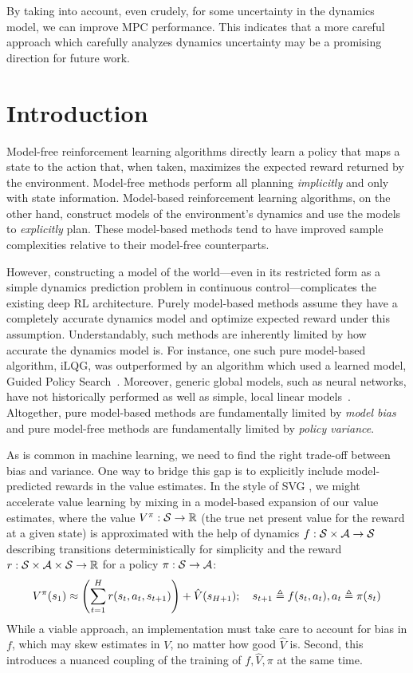 \documentclass{article}
\begin{document}
By taking into account, even crudely, for some uncertainty in the dynamics model, we can improve MPC performance. This indicates that a more careful approach which carefully analyzes dynamics uncertainty may be a promising direction for future work.

\section{Introduction}
Model-free reinforcement learning algorithms directly learn a policy that maps a state to the action that, when taken, maximizes the expected reward returned by the environment. Model-free methods perform all planning \emph{implicitly} and only with state information. Model-based reinforcement learning algorithms, on the other hand, construct models of the environment's dynamics and use the models to \emph{explicitly} plan. These model-based methods tend to have improved sample complexities relative to their model-free counterparts.

However, constructing a model of the world---even in its restricted form as a simple dynamics prediction problem in continuous control---complicates the existing deep RL architecture. Purely model-based methods assume they have a completely accurate dynamics model and optimize expected reward under this assumption. Understandably, such methods are inherently limited by how accurate the dynamics model is. For instance, one such pure model-based algorithm, iLQG, was outperformed by an algorithm which used a learned model, Guided Policy Search~\cite{levine2014learning}. Moreover, generic global models, such as neural networks, have not historically performed as well as simple, local linear models~\cite{gu2016continuous}.  Altogether, pure model-based methods are fundamentally limited by \emph{model bias} and pure model-free methods are fundamentally limited by \emph{policy variance}.

As is common in machine learning, we need to find the right trade-off between bias and variance. One way to bridge this gap is to explicitly include model-predicted rewards in the value estimates. In the style of SVG \cite{heess2015learning}, we might accelerate value learning by mixing in a model-based expansion of our value estimates, where the value $V^\pi:\mathcal{S}\rightarrow \mathbb{R}$ (the true net present value for the reward at a given state) is approximated with the help of dynamics $f:\mathcal{S}\times \mathcal{A}\rightarrow \mathcal{S}$ describing transitions deterministically for simplicity and the reward $r:\mathcal{S}\times\mathcal{A}\times\mathcal{S}\rightarrow\mathbb{R}$ for a policy $\pi:\mathcal{S}\rightarrow \mathcal{A}$:
$$
  V^\pi(s_1)
    \approx \left({\sum_{t=1}^H r(s_t,a_t,s_{t+1})}\right) + \hat{V}(s_{H+1});
    \quad s_{t+1} \triangleq f(s_t, a_t), a_t\triangleq \pi(s_t)
$$
While a viable approach, an implementation must take care to account for bias in $f$, which may skew estimates in $V$, no matter how good $\hat V$ is. Second, this introduces a nuanced coupling of the training of $f,\hat V,\pi$ at the same time.
\end{document}
